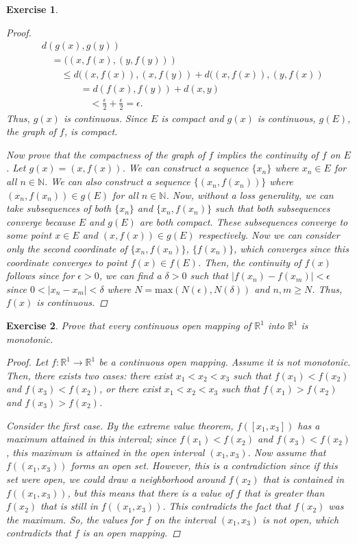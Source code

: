 \documentclass[10pt,letterpaper]{amsart}
\newtheorem{exercise}{Exercise}[section]
\theoremstyle{definition}
\theoremstyle{remark}
\numberwithin{equation}{exercise}
\begin{document}
\begin{multicols}{2}
\begin{exercise}
\begin{proof}
      \begin{align*}
        &d(g(x),g(y))\\
        &\quad=((x,f(x),(y,f(y)))\\
        &\quad\quad\le d((x,f(x)),(x,f(y)) + d((x,f(x)),(y,f(x))\\
        &\quad\quad\quad\quad= d(f(x),f(y)) + d(x,y)\\
        &\quad\quad\quad\quad\quad< \frac{\epsilon}{2} + \frac{\epsilon}{2} = \epsilon.
      \end{align*}
      Thus, $g(x)$ is continuous. Since $E$ is compact and $g(x)$ is continuous, $g(E)$, the graph of $f$, is compact.
      \par Now prove that the compactness of the graph of $f$ implies the continuity of $f$ on $E$. Let $g(x) = (x,f(x))$. We can construct a sequence $\{x_n\}$ where $x_n \in E$ for all $n \in \mathbb{N}$. We can also construct a sequence $\{(x_n,f(x_n))\}$ where $(x_n,f(x_n)) \in g(E)$ for all $n \in \mathbb{N}$. Now, without a loss generality, we can take subsequences of both $\{x_n\}$ and $\{x_n,f(x_n)\}$ such that both subsequences converge because $E$ and $g(E)$ are both compact. These subsequences converge to some point $x \in E$ and $(x,f(x)) \in g(E)$ respectively. Now we can consider only the second coordinate of $\{x_n,f(x_n)\}$, $\{f(x_n)\}$, which converges since this coordinate converges to point $f(x) \in f(E)$. Then, the continuity of $f(x)$ follows since for $\epsilon > 0$, we can find a $\delta > 0$ such that $|f(x_n) - f(x_m)| < \epsilon$ since $0 < |x_n - x_m| < \delta$ where $N=\mathrm{max}(N(\epsilon),N(\delta))$ and $n,m \ge N$. Thus, $f(x)$ is continuous.
    \end{proof}
  \end{exercise}
  \setcounter{exercise}{14}
  \begin{exercise}\label{4.15}
    Prove that every continuous open mapping of $\mathbb{R}^1$ into $\mathbb{R}^1$ is monotonic.
    \begin{proof}
      Let $f:\mathbb{R}^1 \rightarrow \mathbb{R}^1$ be a continuous open mapping. Assume it is not monotonic. Then, there exists two cases: there exist $x_1 < x_2 < x_3$ such that $f(x_1) < f(x_2)$ and $f(x_3) < f(x_2)$, or there exist $x_1 < x_2 < x_3$ such that $f(x_1) > f(x_2)$ and $f(x_3) > f(x_2)$.
      \par Consider the first case. By the extreme value theorem, $f([x_1,x_3])$ has a maximum attained in this interval; since $f(x_1) < f(x_2)$ and $f(x_3) < f(x_2)$, this maximum is attained in the open interval $(x_1,x_3)$. Now assume that $f( (x_1,x_3) )$ forms an open set. However, this is a contradiction since if this set were open, we could draw a neighborhood around $f(x_2)$ that is contained in $f( (x_1,x_3) )$, but this means that there is a value of $f$ that is greater than $f(x_2)$ that is still in $f( (x_1,x_3) )$. This contradicts the fact that $f(x_2)$ was the maximum. So, the values for $f$ on the interval $(x_1,x_3)$ is not open, which contradicts that $f$ is an open mapping.

\end{proof}
\end{exercise}
\end{multicols}
\end{document}
